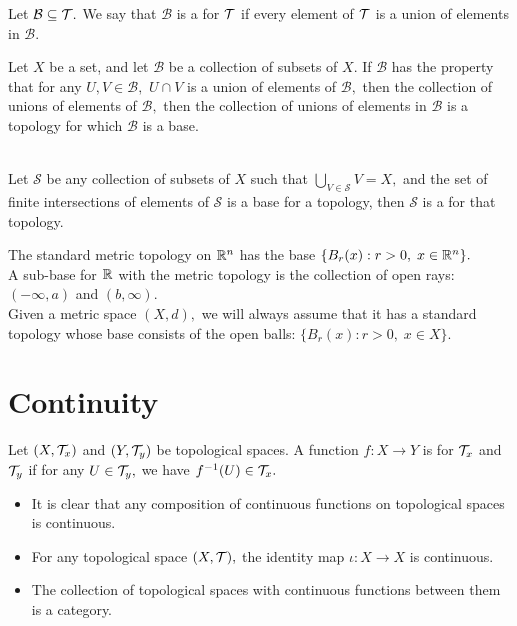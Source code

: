 \begin{defn}
Let $\mathcal{B}\subseteq\mathcal{T}.$ We say that $\mathcal{B}$ is a  for $\mathcal{T}$ if every element of $\mathcal{T}$ is a union of elements in $\mathcal{B}.$
\end{defn}

\begin{prop}
Let $X$ be a set, and let $\mathcal{B}$ be a collection of subsets of $X.$ If $\mathcal{B}$ has the property that for any $U,V\in\mathcal{B},$ $U\cap V$ is a union of elements of $\mathcal{B},$ then the collection of unions of elements of $\mathcal{B},$ then the collection of unions of elements in $\mathcal{B}$ is a topology for which $\mathcal{B}$ is a base. \\ \\
\end{prop}

\begin{defn}
Let $\mathcal{S}$ be any collection of subsets of $X$ such that $\bigcup\limits_{V\in\mathcal{S}} V=X,$ and the set of finite intersections of elements of $\mathcal{S}$ is a base for a topology, then $\mathcal{S}$ is a  for that topology.
\end{defn}

\noindent \Ex The standard metric topology on $\mathbb{R}^{n}$ has the base $\{B_r(x):r>0,\;x\in\mathbb{R}^{n}\}.$ \\ A sub-base for $\mathbb{R}^{}$ with the metric topology is the collection of open rays: $(-\infty,a)$ and $(b,\infty).$ \\
\Ex Given a metric space $(X,d),$ we will always assume that it has a standard topology whose base consists of the open balls: $\{B_r(x):r>0,\;x\in X\}.$

\section{Continuity}

\begin{defn}
Let $(X,\mathcal{T}_x)$ and $(Y,\mathcal{T}_y)$ be topological spaces. A function $f:X\rightarrow Y$ is  for $\mathcal{T}_x$ and $\mathcal{T}_y$ if for any $U\in\mathcal{T}_y,$ we have $f^{-1}(U)\in\mathcal{T}_x.$
\end{defn}

\noindent\begin{itemize}
\item It is clear that any composition of continuous functions on topological spaces is continuous.
\item For any topological space $(X,\mathcal{T}),$ the identity map $\iota:X\rightarrow X$ is continuous.
\item The collection of topological spaces with continuous functions between them is a category.
\end{itemize}

